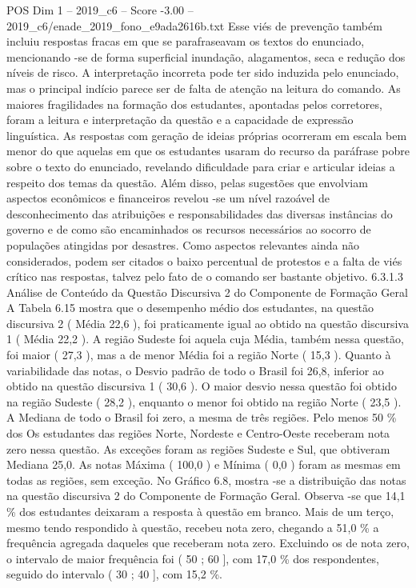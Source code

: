 \begin{textsample}{POS Dim 1 – 2019\_c6 – Score -3.00 – 2019\_c6/enade\_2019\_fono\_e9ada2616b.txt}
Esse viés de prevenção também incluiu respostas fracas em que se parafraseavam os textos do enunciado, mencionando -se de forma superficial inundação, alagamentos, seca e redução dos níveis de risco.
A interpretação incorreta pode ter sido induzida pelo enunciado, mas o principal indício parece ser de falta de atenção na leitura do comando.
As maiores fragilidades na formação dos estudantes, apontadas pelos corretores, foram a leitura e interpretação da questão e a capacidade de expressão linguística.
As respostas com geração de ideias próprias ocorreram em escala bem menor do que aquelas em que os estudantes usaram do recurso da paráfrase pobre sobre o texto do enunciado, revelando dificuldade para criar e articular ideias a respeito dos temas da questão.
Além disso, pelas sugestões que envolviam aspectos econômicos e financeiros revelou -se um nível razoável de desconhecimento das atribuições e responsabilidades das diversas instâncias do governo e de como são encaminhados os recursos necessários ao socorro de populações atingidas por desastres.
Como aspectos relevantes ainda não considerados, podem ser citados o baixo percentual de protestos e a falta de viés crítico nas respostas, talvez pelo fato de o comando ser bastante objetivo. 6.3.1.3 Análise de Conteúdo da Questão Discursiva 2 do Componente de Formação Geral A Tabela 6.15 mostra que o desempenho médio dos estudantes, na questão discursiva 2 ( Média 22,6 ), foi praticamente igual ao obtido na questão discursiva 1 ( Média 22,2 ).
A região Sudeste foi aquela cuja Média, também nessa questão, foi maior ( 27,3 ), mas a de menor Média foi a região Norte ( 15,3 ).
Quanto à variabilidade das notas, o Desvio padrão de todo o Brasil foi 26,8, inferior ao obtido na questão discursiva 1 ( 30,6 ).
O maior desvio nessa questão foi obtido na região Sudeste ( 28,2 ), enquanto o menor foi obtido na região Norte ( 23,5 ).
A Mediana de todo o Brasil foi zero, a mesma de três regiões.
Pelo menos 50 \% dos Os estudantes das regiões Norte, Nordeste e Centro-Oeste receberam nota zero nessa questão.
As exceções foram as regiões Sudeste e Sul, que obtiveram Mediana 25,0.
As notas Máxima ( 100,0 ) e Mínima ( 0,0 ) foram as mesmas em todas as regiões, sem exceção.
No Gráfico 6.8, mostra -se a distribuição das notas na questão discursiva 2 do Componente de Formação Geral.
Observa -se que 14,1 \% dos estudantes deixaram a resposta à questão em branco.
Mais de um terço, mesmo tendo respondido à questão, recebeu nota zero, chegando a 51,0 \% a frequência agregada daqueles que receberam nota zero.
Excluindo os de nota zero, o intervalo de maior frequência foi ( 50 ; 60 ], com 17,0 \% dos respondentes, seguido do intervalo ( 30 ; 40 ], com 15,2 \%.

\end{textsample}

